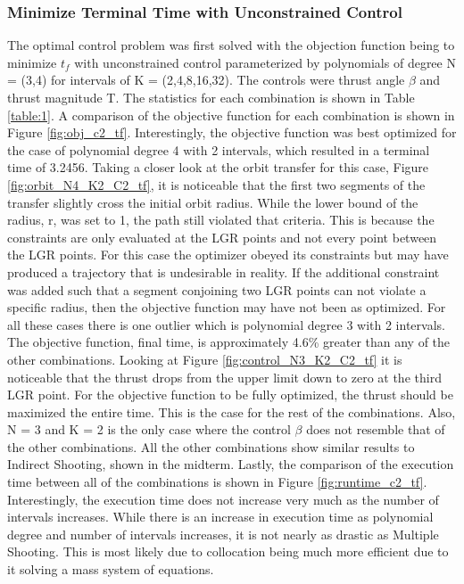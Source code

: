 \documentclass[]{article}
\begin{document}
%     

    \subsubsection{Minimize Terminal Time with Unconstrained Control}
	 The optimal control problem was first solved with the objection function being to minimize \(t_f\) with unconstrained control parameterized by polynomials of degree N = (3,4) for intervals of K = (2,4,8,16,32). The controls were thrust angle \(\beta\) and thrust magnitude T. The statistics for each combination is shown in Table \ref{table:1}. A comparison of the objective function for each combination is shown in Figure \ref{fig:obj_c2_tf}. Interestingly, the objective function was best optimized for the case of polynomial degree 4 with 2 intervals, which resulted in a terminal time of 3.2456. Taking a closer look at the orbit transfer for this case, Figure \ref{fig:orbit_N4_K2_C2_tf}, it is noticeable that the first two segments of the transfer slightly cross the initial orbit radius. While the lower bound of the radius, r, was set to 1, the path still violated that criteria. This is because the constraints are only evaluated at the LGR points and not every point between the LGR points. For this case the optimizer obeyed its constraints but may have produced a trajectory that is undesirable in reality. If the additional constraint was added such that a segment conjoining two LGR points can not violate a specific radius, then the objective function may have not been as optimized. For all these cases there is one outlier which is polynomial degree 3 with 2 intervals. The objective function, final time, is approximately 4.6\% greater than any of the other combinations. Looking at Figure \ref{fig:control_N3_K2_C2_tf} it is noticeable that the thrust drops from the upper limit down to zero at the third LGR point. For the objective function to be fully optimized, the thrust should be maximized the entire time. This is the case for the rest of the combinations. Also, N = 3 and K = 2 is the only case where the control \(\beta\) does not resemble that of the other combinations. All the other combinations show similar results to Indirect Shooting, shown in the midterm. Lastly, the comparison of the execution time between all of the combinations is shown in Figure \ref{fig:runtime_c2_tf}. Interestingly, the execution time does not increase very much as the number of intervals increases. While there is an increase in execution time as polynomial degree and number of intervals increases, it is not nearly as drastic as Multiple Shooting. This is most likely due to collocation being much more efficient due to it solving a mass system of equations.
\end{document}

